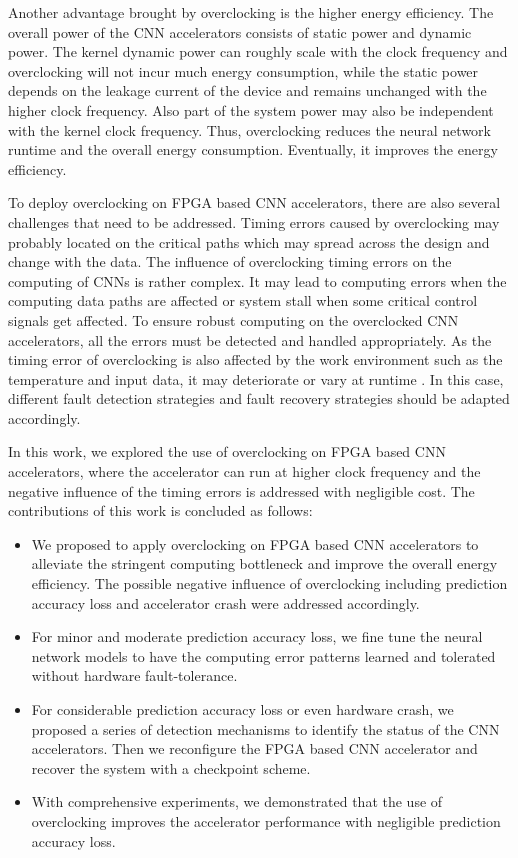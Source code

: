 Another advantage brought by overclocking is the higher 
energy efficiency. The overall power of the CNN accelerators 
consists of static power and dynamic power. The kernel dynamic power 
can roughly scale with the clock frequency and overclocking will not 
incur much energy consumption, while the static power depends on the 
leakage current of the device and remains unchanged with the higher
clock frequency. Also part of the system power may also be 
independent with the kernel clock frequency. Thus, overclocking 
reduces the neural network runtime and the overall energy consumption. 
Eventually, it improves the energy efficiency.

To deploy overclocking on FPGA based CNN accelerators, there are also several
challenges that need to be addressed. Timing errors caused by overclocking 
may probably located on the critical paths which may spread across the 
design and change with the data. The influence of overclocking timing 
errors on the computing of CNNs is rather complex. It may lead to
computing errors when the computing data paths are affected or system stall 
when some critical control signals get affected. To ensure robust computing 
on the overclocked CNN accelerators, all the errors must be detected and 
handled appropriately. As the timing error of overclocking is 
also affected by the work environment such as the temperature 
and input data, it may deteriorate or vary at runtime \cite{Paceline_15}. In this case, 
different fault detection strategies and fault recovery strategies 
should be adapted accordingly. 

In this work, we explored the use of overclocking on FPGA based 
CNN accelerators, where the accelerator can run at higher 
clock frequency and the negative influence of the timing errors 
is addressed with negligible cost. The contributions of this work is 
concluded as follows:

\begin{itemize}
	\item We proposed to apply overclocking on FPGA based CNN accelerators 
		to alleviate the stringent computing bottleneck and improve the 
		overall energy efficiency. The possible negative influence of 
		overclocking including prediction accuracy loss and accelerator 
		crash were addressed accordingly. 

	\item For minor and moderate prediction accuracy loss, we fine tune the 
		neural network models to have the computing error patterns 
		learned and tolerated without hardware fault-tolerance.

	\item For considerable prediction accuracy loss or even hardware crash, we 
		proposed a series of detection mechanisms to identify the status of 
		the CNN accelerators. Then we reconfigure the FPGA based CNN 
		accelerator and recover the system with a checkpoint scheme.

	\item With comprehensive experiments, we demonstrated that the use 
		of overclocking improves the accelerator performance with negligible 
		prediction accuracy loss.
\end{itemize}

